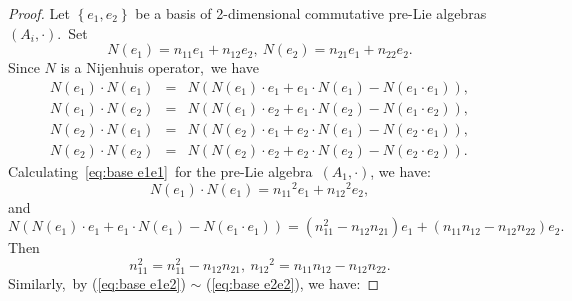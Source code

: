 \documentclass[12pt, reqno]{amsart}
\theoremstyle{plain}
\begin{document}
   \begin{proof}
Let $\left\{e_{1},  e_{2}\right\}$ be a basis of 2-dimensional  commutative pre-Lie algebras~$(A_i,\cdot)$.~Set
  \begin{equation*}\label{eq:An operator on a basis}
    N(e_{1})=n_{11}e_1+n_{12}e_2,~N(e_{2})=n_{21}e_1+n_{22}e_2.
  \end{equation*}
Since $N$ is a Nijenhuis operator,~we have
 \begin{eqnarray}
    N(e_{1}) \cdot N(e_{1})&=&N(N(e_{1}) \cdot  e_{1}+e_{1} \cdot N(e_{1})-N(e_{1} \cdot  e_{1})),\label{eq:base e1e1}\\
     N(e_{1}) \cdot N(e_{2})&=&N(N(e_{1}) \cdot  e_{2}+e_{1} \cdot N(e_{2})-N(e_{1} \cdot  e_{2})),\label{eq:base e1e2}\\
      N(e_{2}) \cdot N(e_{1})&=&N(N(e_{2}) \cdot  e_{1}+e_{2} \cdot N(e_{1})-N(e_{2} \cdot  e_{1})),\label{eq:base e2e1}\\
       N(e_{2}) \cdot N(e_{2})&=&N(N(e_{2}) \cdot  e_{2}+e_{2} \cdot N(e_{2})-N(e_{2} \cdot  e_{2})).\label{eq:base e2e2}
 \end{eqnarray}
Calculating~\eqref{eq:base e1e1}~for the pre-Lie algebra~$(A_{1},\cdot)$, we have:
\begin{equation*}
   N(e_{1}) \cdot N(e_{1})
   = {n_{11}}^2e_1+{n_{12}}^2e_2,\label{eq11}
\end{equation*}
and
\begin{equation*}
  N(N(e_{1}) \cdot  e_{1}+e_{1} \cdot N(e_{1})-N(e_{1} \cdot  e_{1}))
  = (n_{11}^2-n_{12}n_{21})e_1+(n_{11}n_{12}-n_{12}n_{22})e_2.\label{eq12}
\end{equation*}
Then
\begin{equation}\label{A11}
  n_{{11}}^2=n_{11}^2-n_{12}n_{21},~{n_{12}}^2=n_{11}n_{12}-n_{12}n_{22}.
\end{equation}
Similarly,~by (\ref{eq:base e1e2}) $\sim$ (\ref{eq:base e2e2}), we have:

\end{proof}
\end{document}
